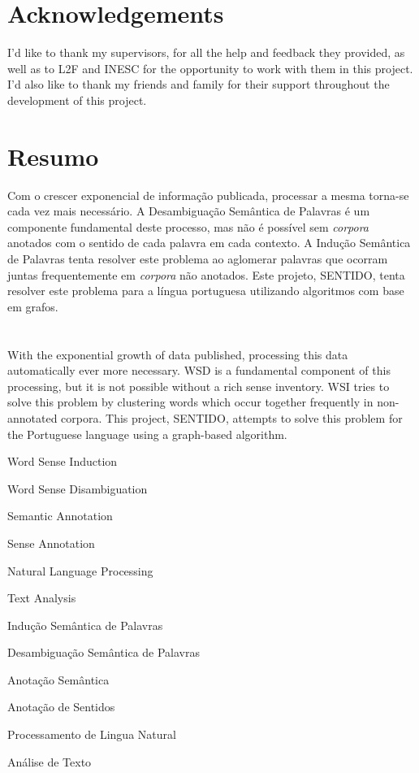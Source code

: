\cleardoublepage
\chapter*{Acknowledgements}
I'd like to thank my supervisors, for all the help and feedback they provided, as well as to L2F and
INESC for the opportunity to work with them in this project. I'd also like to thank my friends and
family for their support throughout the development of this project.

\cleardoublepage
\chapter*{Resumo}
Com o crescer exponencial de informação publicada, processar a mesma torna-se
cada vez mais necessário. A Desambiguação Semântica de Palavras é um componente
fundamental deste processo, mas não é possível sem \emph{corpora} anotados com o
sentido de cada palavra em cada contexto. A Indução Semântica de Palavras tenta
resolver este problema ao aglomerar palavras que ocorram juntas frequentemente
em \emph{corpora} não anotados. Este projeto, \acf*{SENTIDO}, tenta resolver este problema para a língua portuguesa utilizando algoritmos com base em grafos.

\cleardoublepage
\chapter*{\abstractname}
With the exponential growth of data published, processing this data
automatically ever more necessary. \acf*{WSD} is a fundamental component of this
processing, but it is not possible without a rich sense inventory. \acf*{WSI}
tries to solve this problem by clustering words which occur together frequently
in non-annotated corpora. This project, \acf*{SENTIDO}, attempts to solve this
problem for the Portuguese language using a graph-based algorithm.

\cleardoublepage
{}
\begin{keywords}
Word Sense Induction

Word Sense Disambiguation

Semantic Annotation

Sense Annotation

Natural Language Processing

Text Analysis

\bigskip
\bigskip
Indução Semântica de Palavras

Desambiguação Semântica de Palavras

Anotação Semântica

Anotação de Sentidos

Processamento de Lingua Natural

Análise de Texto

\end{keywords}

